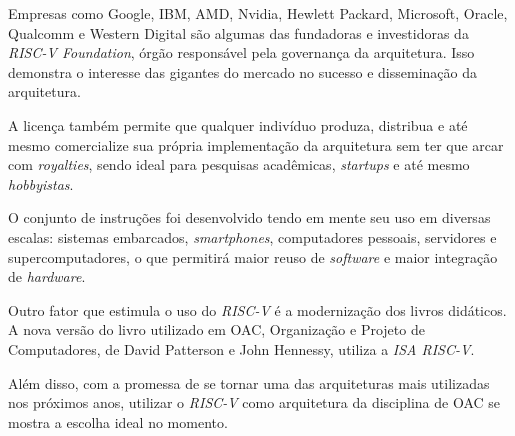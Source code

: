     {Empresas como Google, IBM, AMD, Nvidia, Hewlett Packard, Microsoft, Oracle, Qualcomm e Western Digital são algumas das fundadoras e investidoras da \textit{RISC-V Foundation}, órgão responsável pela governança da arquitetura. Isso demonstra o interesse das gigantes do mercado no sucesso e disseminação da arquitetura.}

    {A licença também permite que qualquer indivíduo produza, distribua e até mesmo comercialize sua própria implementação da arquitetura sem ter que arcar com \textit{royalties}, sendo ideal para pesquisas acadêmicas, \textit{startups} e até mesmo \textit{hobbyistas}.}

    {O conjunto de instruções foi desenvolvido tendo em mente seu uso em diversas escalas: sistemas embarcados, \textit{smartphones}, computadores pessoais, servidores e supercomputadores, o que permitirá maior reuso de \textit{software} e maior integração de \textit{hardware}.}

    {Outro fator que estimula o uso do \textit{RISC-V} é a modernização dos livros didáticos. A nova versão do livro utilizado em OAC, Organização e Projeto de Computadores, de David Patterson e John Hennessy, utiliza a \textit{ISA RISC-V}.}

    {Além disso, com a promessa de se tornar uma das arquiteturas mais utilizadas nos próximos anos, utilizar o \textit{RISC-V} como arquitetura da disciplina de OAC se mostra a escolha ideal no momento.}

